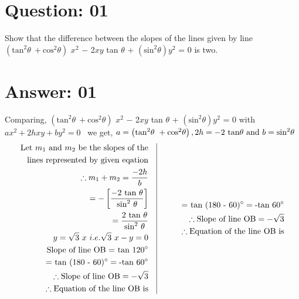 \documentclass[17pt]{extarticle}
\begin{document}
\noindent
\begin{fleqn} 


\section{Question: 01}
Show that the difference between the slopes of the lines given by line $\left(\text{tan}^2\theta \ + \text{cos}^2\theta \right)$ $x^2$ $-$ 2$xy$ tan $\theta$ + $\left(\text{sin}^2\theta\right) y^2 $ = 0  is two.
 

\section{Answer: 01}
Comparing, $\left(\text{tan}^2\theta \ + \text{cos}^2\theta \right)$ $x^2$ $-$ 2$xy$ tan $\theta$ + $\left(\text{sin}^2\theta\right) y^2 $ = 0 with $ax^2 + 2hxy +  by^2 = 0 $  \ we get, $a = \left(\text{tan}^2\theta \ + \text{cos}^2\theta \right),\\ 2h = - 2\ \text {tan}\theta \  \text{and}\ b = \text{sin}^2\theta $
\begin{equation} \nonumber
\begin{alignedat}{4}
\text {Let} \ m_1 \ \text{and}\ m_2\ \text {be the slopes of the}\\ \text {lines represented by given eqation}  \\
\therefore m_1 + m_2 = \frac{-2h}{b} \\ = -\left[\frac{-2\ \text {tan}\ \theta }{\text {sin}^2\ \theta } \right]  \\
= \frac{2\ \text{tan}\ \theta}{\text {sin}^2\ \theta}\\  
y= \sqrt{3}\ x \ i.e. \sqrt{3}\ x - y = 0 \\ 
\text {Slope of line OB = tan 120\degree} \\
\text {= tan (180 - 60)\degree} = \text{-tan}\ 60\degree\\
\therefore \text {Slope of line OB} = -\sqrt{3} \\
\therefore \text{Equation of the line OB is}\\  
\end{alignedat}
\quad
\vrule
\quad
\quad\quad
\begin{alignedat}{4}
\text {= tan (180 - 60)\degree} = \text{-tan}\ 60\degree\\
\therefore \text {Slope of line OB} = -\sqrt{3} \\
\therefore \text{Equation of the line OB is}\\  
\end{alignedat}
\end{equation}
\quad


\end{fleqn}
\end{document}
